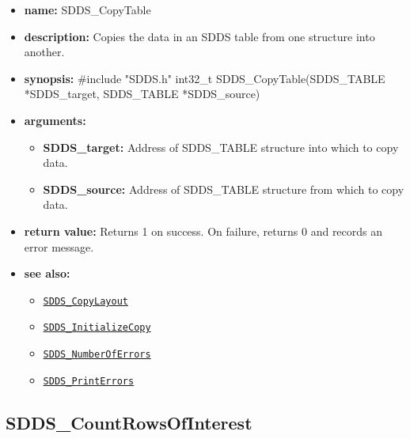 \documentclass[11pt]{article}
\newcommand{\progref}[1]{\hyperref[SDDS_#1]{\tt SDDS\_#1}}
\begin{document}
\begin{itemize}
\item {\bf name:}\newline
SDDS\_CopyTable
\item {\bf description:}\newline
Copies the data in an SDDS table from one structure into another.
\item {\bf synopsis:} \#include "SDDS.h"\newline
int32\_t SDDS\_CopyTable(SDDS\_TABLE *SDDS\_target, SDDS\_TABLE *SDDS\_source)
\item {\bf arguments:}
\begin{itemize}
\item {\bf SDDS\_target:} Address of SDDS\_TABLE structure into which to copy data.
\item {\bf SDDS\_source:} Address of SDDS\_TABLE structure from which to copy data.
\end{itemize}
\item {\bf return value:}\newline
Returns 1 on success. On failure, returns 0 and records an error message.
\item {\bf see also:}
\begin{itemize}
\item \progref{CopyLayout}
\item \progref{InitializeCopy}
\item \progref{NumberOfErrors}
\item \progref{PrintErrors}
\end{itemize}
\end{itemize}

\subsection{SDDS\_CountRowsOfInterest}
\label{SDDS_CountRowsOfInterest}
\end{document}

